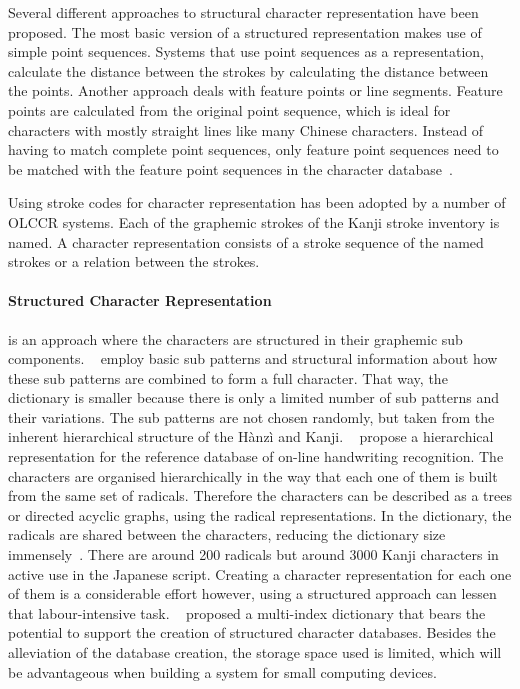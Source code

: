 Several different approaches to structural character representation have been
proposed. The most basic version of a structured representation makes use of 
simple point sequences. Systems that use point sequences as a representation,
calculate the distance between the strokes by calculating the distance
between the points. Another approach deals with feature points or line segments. 
Feature points are calculated from the original point sequence, 
which is ideal for characters with mostly straight lines like many 
Chinese characters. Instead of having to match complete point sequences, 
only feature point sequences need to be matched with the feature point
sequences in the character database~.

Using stroke codes for character representation has been adopted by a number of
OLCCR systems. Each of the graphemic strokes of the Kanji stroke inventory is
named. A character representation consists of a stroke sequence of the named
strokes or a relation between the strokes.

\paragraph{Structured Character Representation} 
is an approach where the characters are structured in their graphemic 
sub components. ~\citeyear{Nakagawa2008} employ basic 
sub patterns and structural information about how these sub patterns are combined 
to form a full character.
That way, the dictionary is smaller because there is only a limited number of 
sub patterns and their variations. The sub patterns are not chosen randomly,
but taken from the inherent hierarchical structure of the Hànzì and Kanji.
~\citeyear{ChenLee1996} propose a hierarchical 
representation for the reference database of on-line handwriting recognition.
The characters are organised hierarchically in the way that each one of them
is built from the same set of radicals. Therefore the characters can be 
described as a trees or directed acyclic graphs, using the radical 
representations. In the dictionary, the radicals are shared between the 
characters, reducing the dictionary size 
immensely~. 
There are around 200 radicals but around 3000 Kanji characters in active use in 
the Japanese script. Creating a character representation for each one of them 
is a considerable effort however, using a structured approach can lessen that 
labour-intensive task. ~\citeyear{Breen2004} proposed 
a multi-index dictionary that bears the potential to support the creation of 
structured character databases. Besides the alleviation of the database creation, 
the storage space used is limited, which will be advantageous when building a 
system for small computing devices.

